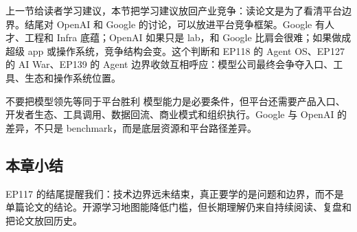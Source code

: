 上一节给读者学习建议，本节把学习建议放回产业竞争：读论文是为了看清平台边界。结尾对 OpenAI 和 Google 的讨论，可以放进平台竞争框架。Google 有人才、工程和 Infra 底蕴；OpenAI 如果只是 lab，和 Google 比肩会很难；如果做成超级 app 或操作系统，竞争结构会变。这个判断和 EP118 的 Agent OS、EP127 的 AI War、EP139 的 Agent 边界收敛互相呼应：模型公司最终会争夺入口、工具、生态和操作系统位置。

\begin{warningbox}{不要把模型领先等同于平台胜利}
模型能力是必要条件，但平台还需要产品入口、开发者生态、工具调用、数据回流、商业模式和组织执行。Google 与 OpenAI 的差异，不只是 benchmark，而是底层资源和平台路径差异。
\end{warningbox}

\subsection{本章小结}

EP117 的结尾提醒我们：技术边界远未结束，真正要学的是问题和边界，而不是单篇论文的结论。开源学习地图能降低门槛，但长期理解仍来自持续阅读、复盘和把论文放回历史。

